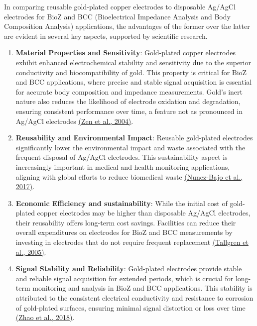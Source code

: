 {
In comparing reusable gold-plated copper electrodes to disposable Ag/AgCl electrodes for BioZ and BCC (Bioelectrical Impedance Analysis and Body Composition Analysis) applications, the advantages of the former over the latter are evident in several key aspects, supported by scientific research.

\begin{enumerate}
    \item \textbf{Material Properties and Sensitivity}: Gold-plated copper electrodes exhibit enhanced electrochemical stability and sensitivity due to the superior conductivity and biocompatibility of gold. This property is critical for BioZ and BCC applications, where precise and stable signal acquisition is essential for accurate body composition and impedance measurements. Gold's inert nature also reduces the likelihood of electrode oxidation and degradation, ensuring consistent performance over time, a feature not as pronounced in Ag/AgCl electrodes \href{https://consensus.app/papers/amino-acid-analysis-using-copper-nanoparticle-plated-zen/95f4e51b52de5e0081608398a7922a14/?utm_source=chatgpt}{(Zen et al., 2004)}.

    \item \textbf{Reusability and Environmental Impact}: Reusable gold-plated electrodes significantly lower the environmental impact and waste associated with the frequent disposal of Ag/AgCl electrodes. This sustainability aspect is increasingly important in medical and health monitoring applications, aligning with global efforts to reduce biomedical waste \href{https://consensus.app/papers/integration-goldsputtered-paper-wireincluded-platforms-nunezbajo/6a42988eac995424b7ba7ccdeef73c27/?utm_source=chatgpt}{(Nunez-Bajo et al., 2017)}.

    \item \textbf{Economic Efficiency and sustainability}: While the initial cost of gold-plated copper electrodes may be higher than disposable Ag/AgCl electrodes, their reusability offers long-term cost savings. Facilities can reduce their overall expenditures on electrodes for BioZ and BCC measurements by investing in electrodes that do not require frequent replacement \href{https://consensus.app/papers/evaluation-commercially-electrodes-gels-recording-tallgren/f57cbd289dfc530d8783f6145a196370/?utm_source=chatgpt}{(Tallgren et al., 2005)}.

    \item \textbf{Signal Stability and Reliability}: Gold-plated electrodes provide stable and reliable signal acquisition for extended periods, which is crucial for long-term monitoring and analysis in BioZ and BCC applications. This stability is attributed to the consistent electrical conductivity and resistance to corrosion of gold-plated surfaces, ensuring minimal signal distortion or loss over time \href{https://consensus.app/papers/fabrication-flexible-stretchable-nanostructured-gold-zhao/57710c3c09fc5a78985f841d4809eada/?utm_source=chatgpt}{(Zhao et al., 2018)}.


\end{enumerate}}
